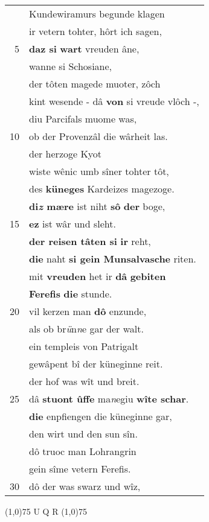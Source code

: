 \documentclass[8pt,a4paper,notitlepage]{article}
\begin{document}
\begin{table}[ht]
\begin{minipage}[t]{0.5\linewidth}
\begin{tabular}{rl}
 & Kundewiramurs begunde klagen\\ 
 & ir vetern tohter, hôrt ich sagen,\\ 
5 & \textbf{daz si} \textbf{wart} vreuden âne,\\ 
 & wanne si Schosiane,\\ 
 & der tôten magede muoter, zôch\\ 
 & kint wesende - dâ \textbf{von} si vreude vlôch -,\\ 
 & diu Parcifals muome was,\\ 
10 & ob der Provenzâl die wârheit las.\\ 
 & der herzoge Kyot\\ 
 & wiste wênic umb sîner tohter tôt,\\ 
 & des \textbf{küneges} Kardeizes magezoge.\\ 
 & \textbf{di\textit{z} mære} ist niht \textbf{sô} \textbf{der} boge,\\ 
15 & \textbf{ez} ist wâr und sleht.\\ 
 & \textbf{der reisen tâten si} \textbf{ir} reht,\\ 
 & \textbf{die} naht \textbf{si gein Munsalvasche} riten.\\ 
 & mit \textbf{vreuden} het ir \textbf{dâ} \textbf{gebiten}\\ 
 & \textbf{Ferefis} \textbf{die} stunde.\\ 
20 & vil kerzen man \textbf{dô} enzunde,\\ 
 & als ob br\textit{ü}n\textit{n}e gar der walt.\\ 
 & ein templeis von Patrigalt\\ 
 & gewâpent bî der küneginne reit.\\ 
 & der hof was wît und breit.\\ 
25 & dâ \textbf{stuont ûffe} ma\textit{n}egiu \textbf{wîte schar}.\\ 
 & \textbf{die} enpfiengen die küneginne gar,\\ 
 & den wirt und den sun sîn.\\ 
 & dô truoc man Lohrangrin\\ 
 & gein sîme vetern Ferefis.\\ 
30 & dô der was swarz und wîz,\\ 
\end{tabular}
\scriptsize
\line(1,0){75} \newline
U Q R \newline
\line(1,0){75} \newline
\newline

\end{minipage}
\end{table}
\end{document}
